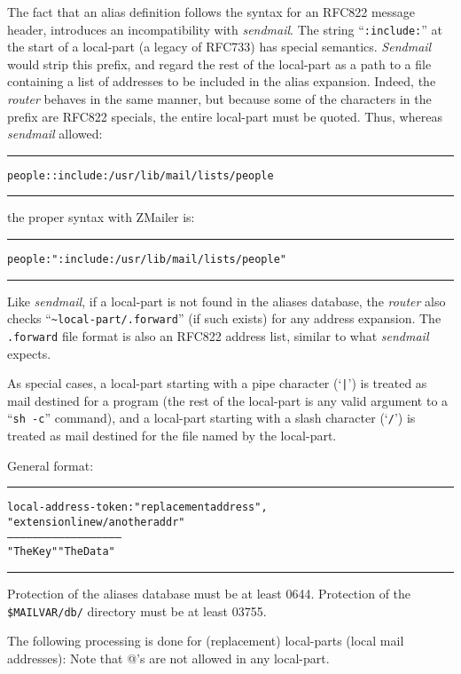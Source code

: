 The fact that an alias definition follows the syntax for an RFC822 message
header, introduces an incompatibility with {\em sendmail}.
The string ``{\tt :include:}'' at the start of a local-part
(a legacy of RFC733) has special semantics.
{\em Sendmail} would strip this prefix, and regard the rest of the local-part
as a path to a file containing a list of addresses to be included in the alias
expansion.
Indeed, the {\em router} behaves in the same manner, but because some of
the characters in the prefix are RFC822 specials, the entire local-part
must be quoted.
Thus, whereas {\em sendmail} allowed:

\begin{alltt}\medskip\hrule\medskip
people: :include:/usr/lib/mail/lists/people
\medskip\hrule\end{alltt}\medskip

the proper syntax with ZMailer is:
\begin{alltt}\medskip\hrule\medskip
people: ":include:/usr/lib/mail/lists/people"
\medskip\hrule\end{alltt}\medskip


Like {\em sendmail}, if a local-part is not found in the aliases database,
the {\em router} also checks ``{\tt \~{}local-part/.forward}''
(if such exists) for any address expansion.
The {\tt .forward} file format is also an RFC822 address list, similar
to what {\em sendmail} expects.

As special cases, a local-part starting with a pipe character (`\verb/|/')
is treated as mail destined for a program (the rest of the local-part is any
valid argument to a ``{\tt sh -c}'' command), and a local-part starting with
a slash character (`{\tt /}') is treated as mail destined for the file named
by the local-part.

General format:

\begin{alltt}\medskip\hrule\medskip
 local-address-token:    "replacement address" ,
                         "extension line w/ another addr"
 --------------------    --------------------------------
     "The Key"                "The Data"
\medskip\hrule\end{alltt}\medskip

Protection of the aliases database must be at least 0644.
Protection of the {\tt \$MAILVAR/db/} directory must be at least 03755.



The following processing is done for (replacement) local-parts
(local mail addresses):  Note that @'s are not allowed in any local-part.



